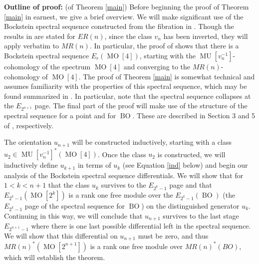 \documentclass[12pt]{amsart}
\numberwithin{equation}{section}
\theoremstyle{plain}  %
\theoremstyle{definition}  %
\DeclareMathOperator{\BOg}{BO}
\DeclareMathOperator{\MO}{MO}
\DeclareMathOperator{\MUg}{MU}
\begin{document}
\noindent

\textbf{Outline of proof:} (of Theorem \ref{main}) Before beginning the proof of Theorem \ref{main} in earnest, we give a brief overview. We will make significant use of the Bockstein spectral sequence constructed from the fibration in \cite[Theorem 1.6]{KW07a}. Though the results in \cite{KW07a} are stated for $ER(n)$, since the class $v_n$ has been inverted, they will apply verbatim to $MR(n)$. In particular, the proof of \cite[Theorem 1.6]{KW07a} shows that there is a Bockstein spectral sequence $E_r(\MO[4])$, starting with the $\MUg[v_n^{-1}]$-cohomology of the spectrum $\MO[4]$ and converging to the $MR(n)$-cohomology of $\MO[4]$. The proof of Theorem \ref{main} is somewhat technical and assumes familiarity with the properties of this spectral sequence, which may be found summarized in \cite[Theorem 2.1]{KW14}. In particular, note that the spectral sequence collapses at the $E_{2^{n+1}}$ page. The final part of the proof will make use of the structure of the spectral sequence for a point and for $\BOg$. These are described in Section 3 and 5 of \cite{KW14}, respectively.

The orientation $u_{n+1}$ will be constructed inductively, starting with a class $u_2 \in \MUg[v_n^{-1}]^*(\MO[4])$. Once the class $u_2$ is constructed, we will inductively define $u_{k+1}$ in terms of $u_k$ (see Equation \ref{ind} below) and begin our analysis of the Bockstein spectral sequence differentials. We will show that for $1<k<n+1$ that the class $u_k$ survives to the $E_{2^k-1}$ page and that $E_{2^k-1}(\MO[2^k])$ is a rank one free module over the $E_{2^k-1}(\BOg)$ (the $E_{2^k-1}$ page of the spectral sequence for $\BOg$) on the distinguished generator $u_k$. Continuing in this way, we will conclude that $u_{n+1}$ survives to the last stage $E_{2^{n+1}-1}$ where there is one last possible differential left in the spectral sequence. We will show that this differential on $u_{n+1}$ must be zero, and thus $MR(n)^*(\MO[2^{n+1}])$ is a rank one free module over $MR(n)^*(BO)$, which will establish the theorem.
\end{document}
